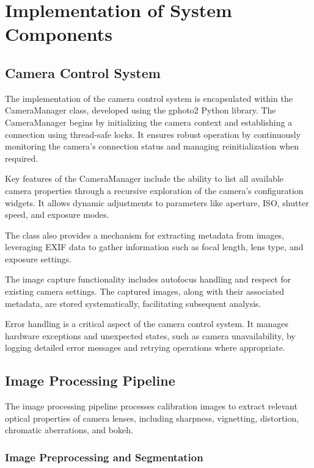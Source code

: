 \section{Implementation of System Components}

\subsection{Camera Control System}
The implementation of the camera control system is encapsulated within the CameraManager class, developed using the gphoto2 Python library. The CameraManager begins by initializing the camera context and establishing a connection using thread-safe locks. It ensures robust operation by continuously monitoring the camera's connection status and managing reinitialization when required.

Key features of the CameraManager include the ability to list all available camera properties through a recursive exploration of the camera's configuration widgets. It allows dynamic adjustments to parameters like aperture, ISO, shutter speed, and exposure modes.

The class also provides a mechanism for extracting metadata from images, leveraging EXIF data to gather information such as focal length, lens type, and exposure settings.

The image capture functionality includes autofocus handling and respect for existing camera settings. The captured images, along with their associated metadata, are stored systematically, facilitating subsequent analysis.

Error handling is a critical aspect of the camera control system. It manages hardware exceptions and unexpected states, such as camera unavailability, by logging detailed error messages and retrying operations where appropriate.

\subsection{Image Processing Pipeline}
The image processing pipeline processes calibration images to extract relevant optical properties of camera lenses, including sharpness, vignetting, distortion, chromatic aberrations, and bokeh.

\subsubsection{Image Preprocessing and Segmentation}

